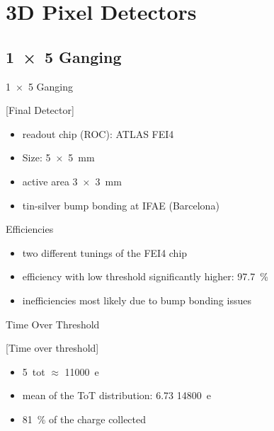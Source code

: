 \section{3D Pixel Detectors}
\subsection{\SI{1x5}{} Ganging}
\begin{frame}{\SI{1x5}{} Ganging}

	[Final Detector]	
	
	\begin{itemize}\itemfill
		\item readout chip (ROC): ATLAS FEI4
		\item Size: \SI{5x5}{\milli\meter}
		\item active area \SI{3x3}{\milli\meter}
		\item tin-silver bump bonding at IFAE (Barcelona)
	\end{itemize}
	
\end{frame}
\begin{frame}{Efficiencies}

	
	\begin{itemize}\itemfill
		\item two different tunings of the FEI4 chip
		\item efficiency with low threshold significantly higher: \SI{97.7}{\%}
		\item inefficiencies most likely due to bump bonding issues
	\end{itemize}
	
\end{frame}
\begin{frame}{Time Over Threshold}

	[Time over threshold]	
	
	\begin{itemize}\itemfill
		\item \SI{5}{tot} $\approx$ \SI{11000}{e}
		\item mean of the ToT distribution: 6.73 \ra \SI{14800}{e}
		\item \SI{81}{\%} of the charge collected
	\end{itemize}
	
\end{frame}
